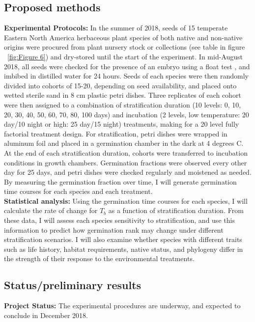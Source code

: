\documentclass{article}\usepackage[]{graphicx}\usepackage[]{color}
\begin{document}
\subsection*{Proposed methods}
\indent\indent\textbf{Experimental Protocols:} In the summer of 2018, seeds of 15 temperate Eastern North America herbaceous plant species of both native and non-native origins were procured from plant nursery stock or collections (see table in figure ~\ref{fig:Figure 6}) and dry-stored until the start of the experiment. In mid-August 2018, all seeds were checked for the presence of an embryo using a float test \citep{Baskin2014}, and imbibed in distilled water for 24 hours. Seeds of each species were then randomly divided into cohorts of 15-20, depending on seed availability, and placed onto wetted sterile sand in 8 cm plastic petri dishes. Three replicates of each cohort were then assigned to a combination of stratification duration (10 levels: 0, 10, 20, 30, 40, 50, 60, 70, 80, 100 days) and incubation (2 levels, low temperature: 20 day/10 night or high: 25 day/15 night) treatments, making for a 20 level fully factorial treatment design. For stratification, petri dishes were wrapped in aluminum foil and placed in a germination chamber in the dark at 4 degrees C. At the end of each stratification duration, cohorts were transferred to incubation conditions in growth chambers. Germination fractions were observed every other day for 25 days, and petri dishes were checked regularly and moistened as needed. By measuring the germination fraction over time, I will generate germination time courses for each species and each treatment.\\
\indent\textbf{Statistical analysis:} Using the germination time courses for each species, I will calculate the rate of change for $T_b$ as a function of stratification duration. From these data, I will assess each species sensitivity to stratification, and use this information to predict how germination rank may change under different stratification scenarios. I will also examine whether species with different traits such as life history, habitat requirements, native status, and phylogeny differ in the strength of their response to the environmental treatments.\\
\subsection*{Status/preliminary results}
\textbf{Project Status:} The experimental procedures are underway, and expected to conclude in December 2018.\\
\end{document}
